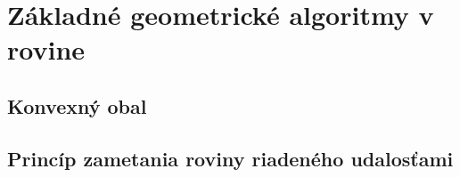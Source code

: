 \documentclass[../main.tex]{subfiles}
\begin{document}
\section{Základné geometrické algoritmy v rovine}
\subsection{Konvexný obal}
\subsection{Princíp zametania roviny riadeného udalosťami}
\end{document}
